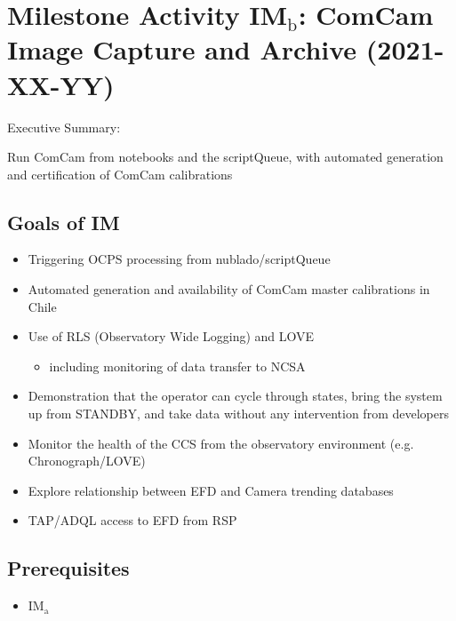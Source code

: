 \section{Milestone Activity IM\(_{\text{b}}\): ComCam Image Capture and Archive    (2021-XX-YY)}
\label{sec:org7cdd779}

Executive Summary:

Run ComCam from notebooks and the scriptQueue, with automated generation and certification of ComCam calibrations

\subsection{Goals of IM}
\label{sec:org3154347}
\begin{itemize}
\item Triggering \gls{OCPS} processing from nublado/scriptQueue
\item Automated generation and availability of ComCam master calibrations in Chile
\item Use of RLS (Observatory Wide Logging) and LOVE
\begin{itemize}
\item including monitoring of data transfer to NCSA
\end{itemize}
\item Demonstration that the operator can cycle through states, bring
the system up from STANDBY, and take data without any intervention from developers
\item Monitor the health of the CCS from the observatory environment (e.g. Chronograph/LOVE)
\item Explore relationship between EFD and Camera trending databases
\item TAP/ADQL access to EFD from RSP
\end{itemize}

\subsection{Prerequisites}
\begin{itemize}
\item{IM\(_{\text{a}}\)}
\end{itemize}

